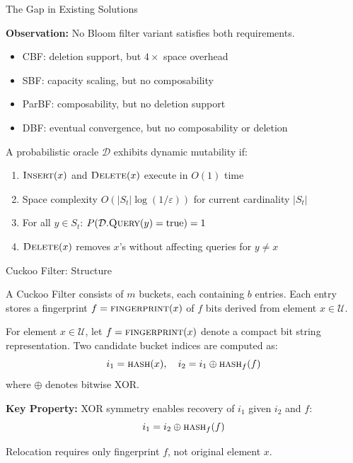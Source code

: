 \documentclass{beamer}
\begin{document}
\begin{frame}{The Gap in Existing Solutions}

    \textbf{Observation:} No Bloom filter variant satisfies both requirements.

    \begin{itemize}
        \item CBF: deletion support, but $4\times$ space overhead
        \item SBF: capacity scaling, but no composability
        \item ParBF: composability, but no deletion support
        \item DBF: eventual convergence, but no composability or deletion
    \end{itemize}

    \begin{definition}
        A probabilistic oracle $\mathcal{D}$ exhibits dynamic mutability if:
        \begin{enumerate}
            \item $\textsc{Insert}(x)$ and $\textsc{Delete}(x)$ execute in $O(1)$ time
            \item Space complexity $O(|S_t| \log(1/\varepsilon))$ for current cardinality $|S_t|$
            \item For all $y \in S_t$: $P(\mathcal{D}.\textsc{Query}(y) = \text{true}) = 1$
            \item $\textsc{Delete}(x)$ removes $x$'s without affecting queries for $y \neq x$
        \end{enumerate}
    \end{definition}

\end{frame}

\begin{frame}{Cuckoo Filter: Structure}

    \begin{definition}
        A Cuckoo Filter consists of $m$ buckets, each containing $b$ entries. Each entry stores a fingerprint $f = \textsc{fingerprint}(x)$ of $f$ bits derived from element $x \in \mathcal{U}$.
    \end{definition}

    \begin{definition}
        For element $x \in \mathcal{U}$, let $f = \textsc{fingerprint}(x)$ denote a compact bit string representation. Two candidate bucket indices are computed as:
        $$i_1 = \textsc{hash}(x), \quad i_2 = i_1 \oplus \textsc{hash}_f(f)$$
        where $\oplus$ denotes bitwise XOR.
    \end{definition}

    \textbf{Key Property:} XOR symmetry enables recovery of $i_1$ given $i_2$ and $f$:
    $$i_1 = i_2 \oplus \textsc{hash}_f(f)$$

    Relocation requires only fingerprint $f$, not original element $x$.

\end{frame}
\end{document}
